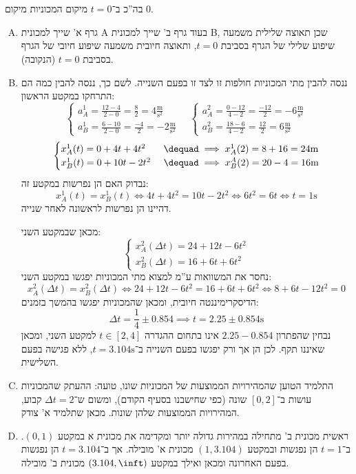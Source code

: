 \documentclass[]{../../../tex/classes/homework}
\let\mrm \mathrm
\begin{document}
	\section{}
	בה''כ ב־$t = 0$ מיקום המכוניות מיקום $0$. 
	\begin{enumerate}[A.]
		\item גרף א' שייך למכונית A בעוד גרף ב' שייך למכונית B, שכן תאוצה שלילית משמעה שיפוע שלילי של הגרף בסביבת $t = 0$, ותאוצה חיובית משמעה שיפוע חיובי של הגרף בסביבת $t = 0$ (הנקובה). 
		\item[ב+ג.] ננסה להבין מתי המכוניות חולפות זו לצד זו בפעם השנייה. לשם כך, ננסה להבין כמה הם התרחקו במקטע הראשון: 
		\[ \begin{cases}
			a_A^{1} = \frac{12 - 4}{2 - 0} = \frac{8}{2} = 4\mrm{\frac{m}{s^{2}}} \\
			a_B^{1} = \frac{6 - 10}{2 - 0} = \frac{-4}{2} = -2\mrm{\frac{m}{s^{2}}}
		\end{cases} \quad \begin{cases}
			a_A^{2} = \frac{0 - 12}{4 - 2} = \frac{-12}{2} = -6\mrm{\frac{m}{s^{2}}} \\
			a_B^{2} = \frac{18 - 6}{4 - 2} = \frac{12}{2} = 6\mrm{\frac{m}{s^{2}}}
		\end{cases} \]
		\[ \begin{cases}
			x_A^{1}(t) = 0 + 4t + 4t^{2} &\ \dequad \implies x_A^{1}(2) = 8 + 16 = 24\mrm{m} \\
			x_B^{1}(t) = 0 + 10t - 2t^{2} &\ \dequad \implies x_B^{A}(2) = 20 - 4 = 16\mrm{m}
		\end{cases} \]
		נבדוק האם הן נפרשות במקטע זה: 
		\[ x_A^{1}(t) = x_B^{1}(t) \iff 4t + 4t^{2} = 10t - 2t^{2} \iff 6t^{2} = 6t \iff t = 1\mrm{s} \]
		דהיינו הן נפרשות לראשונה לאחר שנייה. 
		
		מכאן שבמקטע השני: 
		\[ \begin{cases}
			x_A^{2}(\Delta t) = 24 + 12t - 6t^{2} \\
			x_B^{2}(\Delta t) = 16 + 6t + 6t^{2}
		\end{cases} \]
		נחסר את המשוואות ע''מ למצוא מתי המכוניות יפגשו במקטע השני: 
		\[ x_A^{2}(\Delta t) = x_B^{2}(\Delta t) \iff 24 +12t  - 6t^{2} = 16 + 6t + 6t^{2} \iff 8 + 6t - 12t^{2} = 0 \]
		הדיסקרימיננטה חיובית, ומכאן שהמכוניות יפגשו בהמשך בזמנים: 
		\[ \Delta t = \frac{1}{4}\pm 0.854 \implies t = 2.25 \pm 0.854 \mrm{s} \]
		נבחין שהפתרון $2.25 - 0.854$ אינו בתחום ההגדרה $t \in [2, 4]$ למקטע השני, ומכאן שאיננו תקף. לכן הן אך ורק יפגשו בפעם השנייה ב־$t = 3.104\mrm{s}$, ללא פגישה בפעם השלישית. 
		\item התלמיד הטוען שהמהירויות הממוצעות של המכוניות שונו, טועה: ההעתק שהמכוניות עושות ב־$[0, 2]$ שונה (כפי שחישבנו בסעיף הקודם), ומשום ש־$\Delta t = 2$ קבוע, המהירויות הממוצעות שלהן שונות. מכאן שתלמיד א' צודק. 
		\item ראשית מכונית ב' מתחילה במהירות גדולה יותר ומקדימה את מכונית א במקטע $(0, 1)$. ב־$t = 1$ הן נפגשות ובמקטע $(1, 3.104)$ מכונית א' מובילה. אך ב־$t = 3.104$ הן נפגשות בפעם האחרונה ומכאן ואילך במקטע $(3.104, \inft)$ מכונית ב' מובילה. 
	\end{enumerate}
	
	
	\ndoc
\end{document}
